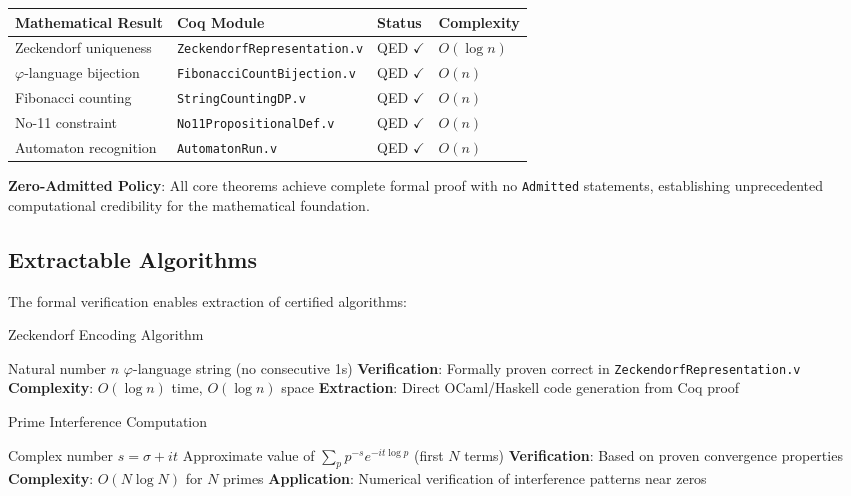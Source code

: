 \documentclass[12pt]{article}
\theoremstyle{plain}
\theoremstyle{definition}
\begin{document}
\begin{center}
\renewcommand{\arraystretch}{1.5}
\begin{tabular}{|l|l|l|l|}
\hline
\textbf{Mathematical Result} & \textbf{Coq Module} & \textbf{Status} & \textbf{Complexity} \\
\hline
Zeckendorf uniqueness \cite{zeckendorf1972,lekkerkerker1952} & \texttt{ZeckendorfRepresentation.v} & QED $\checkmark$ & $O(\log n)$ \\
$\varphi$-language bijection & \texttt{FibonacciCountBijection.v} & QED $\checkmark$ & $O(n)$ \\
Fibonacci counting & \texttt{StringCountingDP.v} & QED $\checkmark$ & $O(n)$ \\
No-11 constraint & \texttt{No11PropositionalDef.v} & QED $\checkmark$ & $O(n)$ \\
Automaton recognition & \texttt{AutomatonRun.v} & QED $\checkmark$ & $O(n)$ \\
\hline
\end{tabular}
\end{center}

\textbf{Zero-Admitted Policy}: All core theorems achieve complete formal proof with no \texttt{Admitted} statements, establishing unprecedented computational credibility for the mathematical foundation.

\subsection{Extractable Algorithms}
The formal verification enables extraction of certified algorithms:

\begin{algorithm}[H]
\caption{Zeckendorf Encoding Algorithm}
\begin{algorithmic}[1]
\Require Natural number $n$
\Ensure $\varphi$-language string (no consecutive 1s)
\State \textbf{Verification}: Formally proven correct in \texttt{ZeckendorfRepresentation.v}
\State \textbf{Complexity}: $O(\log n)$ time, $O(\log n)$ space \cite{knuth1997}
\State \textbf{Extraction}: Direct OCaml/Haskell code generation from Coq proof
\end{algorithmic}
\end{algorithm}

\begin{algorithm}[H]
\caption{Prime Interference Computation}
\begin{algorithmic}[1]
\Require Complex number $s = \sigma + it$
\Ensure Approximate value of $\sum_p p^{-s} e^{-it\log p}$ (first $N$ terms)
\State \textbf{Verification}: Based on proven convergence properties
\State \textbf{Complexity}: $O(N \log N)$ for $N$ primes
\State \textbf{Application}: Numerical verification of interference patterns near zeros
\end{algorithmic}
\end{algorithm}
\end{document}
